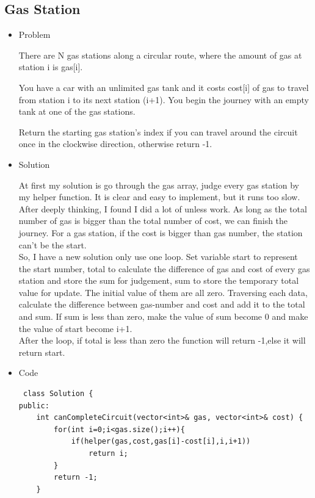 \documentclass[10pt]{article}
\begin{document}
 \subsection*{Gas Station}
 \begin{itemize}
 \item Problem
 \begin{flushleft}
 There are N gas stations along a circular route, where the amount of gas at station i is gas[i].

You have a car with an unlimited gas tank and it costs cost[i] of gas to travel from station i to its next station (i+1). You begin the journey with an empty tank at one of the gas stations.

Return the starting gas station's index if you can travel around the circuit once in the clockwise direction, otherwise return -1.
 
 \end{flushleft}
 \item Solution
 \begin{flushleft}
 At first my solution is go through the gas array, judge every gas station by my helper function. It is clear and easy to implement, but it runs too slow. After deeply thinking, I found I did a lot of unless work. As long as the total number of gas is bigger than the total number of cost, we can finish the journey. For a  gas station, if the cost is bigger than gas number, the station can't be the start. \\
 So, I have a new solution only use one loop. Set variable start to represent the start number, total to calculate the difference of gas and cost of every gas station and store the sum for judgement, sum to store the temporary total value for update. The initial value of them are all zero. Traversing each data, calculate the difference between gas-number and cost and add it to the total and sum. If sum is less than zero, make the value of sum become 0 and make the value of start become i+1.\\
 After the loop, if total is less than zero the function will return -1,else it will return start.
 \end{flushleft}
 \item Code
 \begin{lstlisting}
 class Solution {
public:
    int canCompleteCircuit(vector<int>& gas, vector<int>& cost) {
        for(int i=0;i<gas.size();i++){
            if(helper(gas,cost,gas[i]-cost[i],i,i+1))
                return i;
        }
        return -1;
    }


\end{lstlisting}
\end{itemize}
\end{document}

